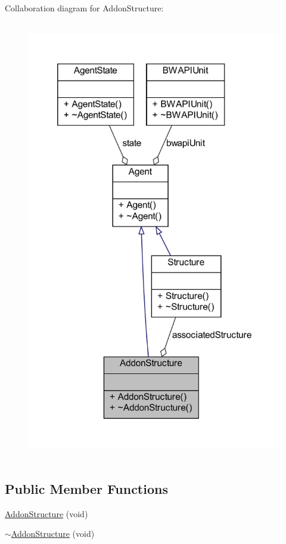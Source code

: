 Collaboration diagram for Addon\-Structure\-:
\nopagebreak
\begin{figure}[H]
\begin{center}
\leavevmode
\includegraphics[height=550pt]{classAddonStructure__coll__graph}
\end{center}
\end{figure}
\subsection*{Public Member Functions}
\begin{DoxyCompactItemize}
\item 
\hyperlink{classAddonStructure_a72fb6ff3517e428986ce1183223a0491}{Addon\-Structure} (void)
\item 
\hyperlink{classAddonStructure_a1c15298baa946a3f489755a08473585a}{$\sim$\-Addon\-Structure} (void)
\end{DoxyCompactItemize}
